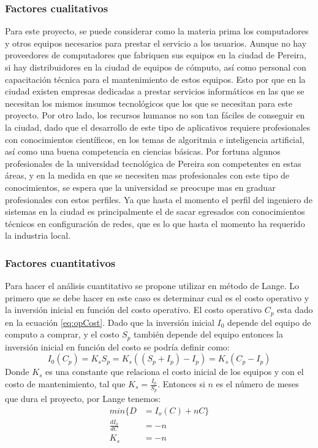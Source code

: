 \documentclass[a4paper, 12pt, oneside]{article}
\begin{document}
	\subsubsection{Factores cualitativos}
	Para este proyecto, se puede considerar como la materia prima los computadores y otros equipos necesarios para prestar el servicio a los usuarios. Aunque no hay proveedores de computadores que fabriquen sus equipos en la ciudad de Pereira, si hay distribuidores en la ciudad de equipos de cómputo, así como personal con capacitación técnica para el mantenimiento de estos equipos. Esto por que en la ciudad existen empresas dedicadas a prestar servicios informáticos en las que se necesitan los mismos insumos tecnológicos que los que se necesitan para este proyecto.
	Por otro lado, los recursos humanos no son tan fáciles de conseguir en la ciudad, dado que el desarrollo de este tipo de aplicativos requiere profesionales con conocimientos científicos, en los temas de algoritmia e inteligencia artificial, así como una buena competencia en ciencias básicas. Por fortuna algunos profesionales de la universidad tecnológica de Pereira son competentes en estas áreas, y en la medida en que se necesiten mas profesionales con este tipo de conocimientos, se espera que la universidad se preocupe mas en graduar profesionales con estos perfiles. Ya que hasta el momento el perfil del ingeniero de sistemas en la ciudad es principalmente el de sacar egresados con conocimientos técnicos en configuración de redes, que es lo que hasta el momento ha requerido la industria local.
	
	\subsubsection{Factores cuantitativos}
	Para hacer el análisis cuantitativo se propone utilizar en método de Lange. Lo primero que se debe hacer en este caso es determinar cual es el costo operativo y la inversión inicial en función del costo operativo. El costo operativo $C_p$ esta dado en la ecuación \ref{eq:opCost}. Dado que la inversión inicial $I_0$ depende del equipo de computo a comprar, y el costo $S_p$ también depende del equipo entonces la inversión inicial en función del costo se podría definir como:
	\begin{equation}
		I_0(C_p) = K_sS_p = K_s((S_p+I_p) - I_p) = K_s(C_p - I_p)
		\label{eq:InvCost}
	\end{equation}
	Donde $K_s$ es una constante que relaciona el costo inicial de los equipos y con el costo de mantenimiento, tal que $K_s=\frac{I_0}{S_p}$. Entonces si $n$ es el número de meses que dura el proyecto, por Lange tenemos:
	\begin{align*}
		min\{D&=I_o(C)+nC\} \\
		\frac{dI_o}{dC}&=-n \\
		K_s &= -n
	\end{align*}
	
\end{document}
